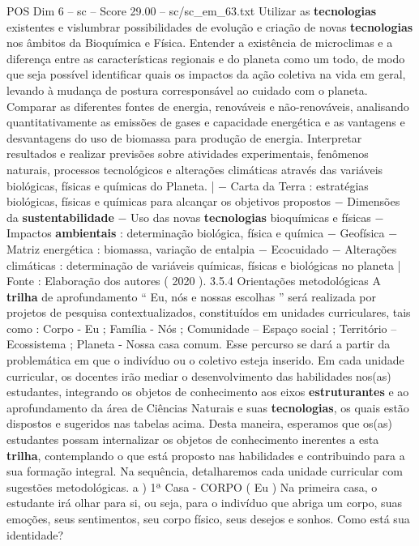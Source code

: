 \begin{textsample}{POS Dim 6 – sc – Score 29.00 – sc/sc\_em\_63.txt}
Utilizar as \textbf{tecnologias} existentes e vislumbrar possibilidades de evolução e criação de novas \textbf{tecnologias} nos âmbitos da Bioquímica e Física.
Entender a existência de microclimas e a diferença entre as características regionais e do planeta como um todo, de modo que seja possível identificar quais os impactos da ação coletiva na vida em geral, levando à mudança de postura corresponsável ao cuidado com o planeta.
Comparar as diferentes fontes de energia, renováveis e não-renováveis, analisando quantitativamente as emissões de gases e capacidade energética e as vantagens e desvantagens do uso de biomassa para produção de energia.
Interpretar resultados e realizar previsões sobre atividades experimentais, fenômenos naturais, processos tecnológicos e alterações climáticas através das variáveis biológicas, físicas e químicas do Planeta. | − Carta da Terra : estratégias biológicas, físicas e químicas para alcançar os objetivos propostos − Dimensões da \textbf{sustentabilidade} − Uso das novas \textbf{tecnologias} bioquímicas e físicas − Impactos \textbf{ambientais} : determinação biológica, física e química − Geofísica − Matriz energética : biomassa, variação de entalpia − Ecocuidado − Alterações climáticas : determinação de variáveis químicas, físicas e biológicas no planeta | Fonte : Elaboração dos autores ( 2020 ). 3.5.4 Orientações metodológicas A \textbf{trilha} de aprofundamento “ Eu, nós e nossas escolhas ” será realizada por projetos de pesquisa contextualizados, constituídos em unidades curriculares, tais como : Corpo - Eu ; Família - Nós ; Comunidade – Espaço social ; Território – Ecossistema ; Planeta - Nossa casa comum.
Esse percurso se dará a partir da problemática em que o indivíduo ou o coletivo esteja inserido.
Em cada unidade curricular, os docentes irão mediar o desenvolvimento das habilidades nos(as) estudantes, integrando os objetos de conhecimento aos eixos \textbf{estruturantes} e ao aprofundamento da área de Ciências Naturais e suas \textbf{tecnologias}, os quais estão dispostos e sugeridos nas tabelas acima.
Desta maneira, esperamos que os(as) estudantes possam internalizar os objetos de conhecimento inerentes a esta \textbf{trilha}, contemplando o que está proposto nas habilidades e contribuindo para a sua formação integral.
Na sequência, detalharemos cada unidade curricular com sugestões metodológicas. a ) 1ª Casa - CORPO ( Eu ) Na primeira casa, o estudante irá olhar para si, ou seja, para o indivíduo que abriga um corpo, suas emoções, seus sentimentos, seu corpo físico, seus desejos e sonhos.
Como está sua identidade?

\end{textsample}
